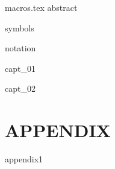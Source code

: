 \documentclass[oneside,english]{book}
\theoremstyle{plain}
\theoremstyle{definition}
\theoremstyle{definition}
\theoremstyle{plain}
\theoremstyle{myExamStyle}
\theoremstyle{myDefinitionStyle}
\theoremstyle{named}
\begin{document}
\agradecimentosautorcont{ }
\agradecimentosautorii{}
\agradecimentosautoriii{}

\runfrontend{}

{macros.tex}
{abstract}

\sumario

\listadefiguras

\listadetabelas

\markboth{}{}

{symbols}

{notation}

\mainmatter 
\setcounter{page}{1} \pagestyle{plain} 

{capt_01}

{capt_02}

\part*{APPENDIX}


\appendix
{appendix1}


%

\end{document}
